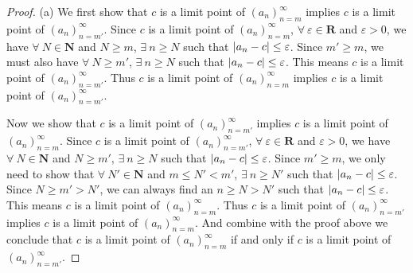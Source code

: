 \begin{proof}{(a)}
We first show that \(c\) is a limit point of \((a_n)_{n = m}^\infty\) implies \(c\) is a limit point of \((a_n)_{n = m'}^\infty\).
Since \(c\) is a limit point of \((a_n)_{n = m}^\infty\), \(\forall\ \varepsilon \in \mathbf{R}\) and \(\varepsilon > 0\), we have \(\forall\ N \in \mathbf{N}\) and \(N \geq m\), \(\exists\ n \geq N\) such that \(\abs*{a_n - c} \leq \varepsilon\).
Since \(m' \geq m\), we must also have \(\forall\ N \geq m'\), \(\exists\ n \geq N\) such that \(\abs*{a_n - c} \leq \varepsilon\).
This means \(c\) is a limit point of \((a_n)_{n = m'}^\infty\).
Thus \(c\) is a limit point of \((a_n)_{n = m}^\infty\) implies \(c\) is a limit point of \((a_n)_{n = m'}^\infty\).

Now we show that \(c\) is a limit point of \((a_n)_{n = m'}^\infty\) implies \(c\) is a limit point of \((a_n)_{n = m}^\infty\).
Since \(c\) is a limit point of \((a_n)_{n = m'}^\infty\), \(\forall\ \varepsilon \in \mathbf{R}\) and \(\varepsilon > 0\), we have \(\forall\ N \in \mathbf{N}\) and \(N \geq m'\), \(\exists\ n \geq N\) such that \(\abs*{a_n - c} \leq \varepsilon\).
Since \(m' \geq m\), we only need to show that \(\forall\ N' \in \mathbf{N}\) and \(m \leq N' < m'\), \(\exists\ n \geq N'\) such that \(\abs*{a_n - c} \leq \varepsilon\).
Since \(N \geq m' > N'\), we can always find an \(n \geq N > N'\) such that \(\abs*{a_n - c} \leq \varepsilon\).
This means \(c\) is a limit point of \((a_n)_{n = m}^\infty\).
Thus \(c\) is a limit point of \((a_n)_{n = m'}^\infty\) implies \(c\) is a limit point of \((a_n)_{n = m}^\infty\).
And combine with the proof above we conclude that \(c\) is a limit point of \((a_n)_{n = m}^\infty\) if and only if \(c\) is a limit point of \((a_n)_{n = m'}^\infty\).
\end{proof}

